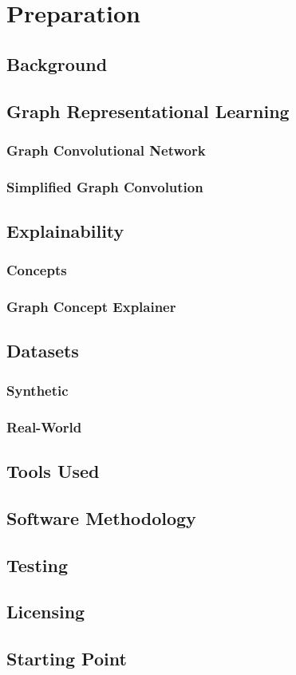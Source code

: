 \chapter{Preparation}

\section{Background}

\section{Graph Representational Learning}

\subsection{Graph Convolutional Network}

\subsection{Simplified Graph Convolution}

\section{Explainability}

\subsection{Concepts}

\subsection{Graph Concept Explainer}

\section{Datasets}

\subsection{Synthetic}

\subsection{Real-World}

\section{Tools Used}


\section{Software Methodology}

\section{Testing}

\section{Licensing}

\section{Starting Point}

